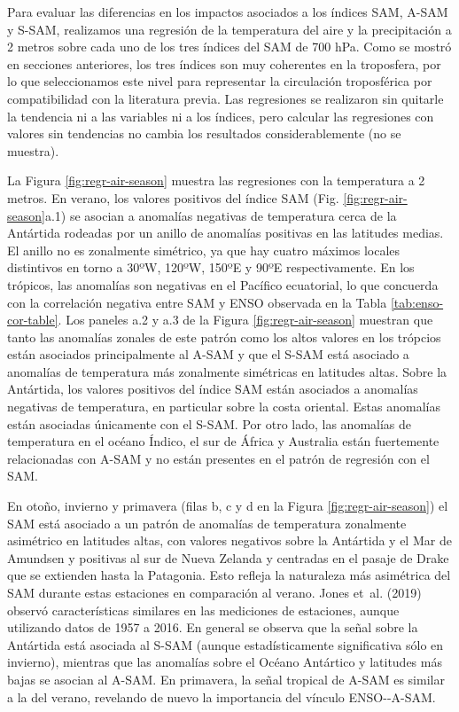 \documentclass[12pt,oneside,a4paper]{reedthesis}
\begin{document}
Para evaluar las diferencias en los impactos asociados a los índices SAM, A-SAM y S-SAM, realizamos una regresión de la temperatura del aire y la precipitación a 2 metros sobre cada uno de los tres índices del SAM de 700 hPa.
Como se mostró en secciones anteriores, los tres índices son muy coherentes en la troposfera, por lo que seleccionamos este nivel para representar la circulación troposférica por compatibilidad con la literatura previa.
Las regresiones se realizaron sin quitarle la tendencia ni a las variables ni a los índices, pero calcular las regresiones con valores sin tendencias no cambia los resultados considerablemente (no se muestra).

La Figura \ref{fig:regr-air-season} muestra las regresiones con la temperatura a 2 metros.
En verano, los valores positivos del índice SAM (Fig. \ref{fig:regr-air-season}a.1) se asocian a anomalías negativas de temperatura cerca de la Antártida rodeadas por un anillo de anomalías positivas en las latitudes medias.
El anillo no es zonalmente simétrico, ya que hay cuatro máximos locales distintivos en torno a 30ºW, 120ºW, 150ºE y 90ºE respectivamente.
En los trópicos, las anomalías son negativas en el Pacífico ecuatorial, lo que concuerda con la correlación negativa entre SAM y ENSO observada en la Tabla \ref{tab:enso-cor-table}.
Los paneles a.2 y a.3 de la Figura \ref{fig:regr-air-season} muestran que tanto las anomalías zonales de este patrón como los altos valores en los trópcios están asociados principalmente al A-SAM y que el S-SAM está asociado a anomalías de temperatura más zonalmente simétricas en latitudes altas.
Sobre la Antártida, los valores positivos del índice SAM están asociados a anomalías negativas de temperatura, en particular sobre la costa oriental.
Estas anomalías están asociadas únicamente con el S-SAM.
Por otro lado, las anomalías de temperatura en el océano Índico, el sur de África y Australia están fuertemente relacionadas con A-SAM y no están presentes en el patrón de regresión con el SAM.

En otoño, invierno y primavera (filas b, c y d en la Figura \ref{fig:regr-air-season}) el SAM está asociado a un patrón de anomalías de temperatura zonalmente asimétrico en latitudes altas, con valores negativos sobre la Antártida y el Mar de Amundsen y positivas al sur de Nueva Zelanda y centradas en el pasaje de Drake que se extienden hasta la Patagonia.
Esto refleja la naturaleza más asimétrica del SAM durante estas estaciones en comparación al verano.
Jones et~al. (2019) observó características similares en las mediciones de estaciones, aunque utilizando datos de 1957 a 2016.
En general se observa que la señal sobre la Antártida está asociada al S-SAM (aunque estadísticamente significativa sólo en invierno), mientras que las anomalías sobre el Océano Antártico y latitudes más bajas se asocian al A-SAM.
En primavera, la señal tropical de A-SAM es similar a la del verano, revelando de nuevo la importancia del vínculo ENSO-\/-A-SAM.
\end{document}
